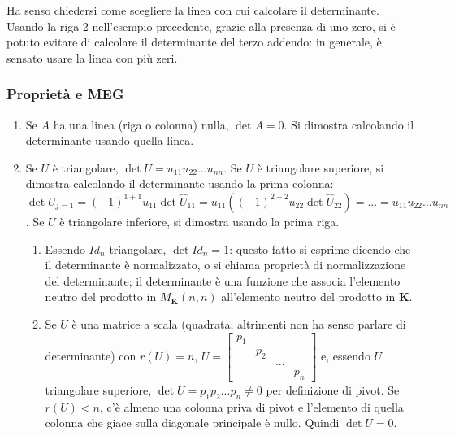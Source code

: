 \documentclass{article}
\begin{document}
Ha senso chiedersi come scegliere la linea con cui calcolare il
determinante. Usando la riga 2 nell'esempio precedente, grazie alla presenza
di uno zero, si \`{e} potuto evitare di calcolare il determinante del terzo
addendo: in generale, \`{e} sensato usare la linea con pi\`{u} zeri.

\subsubsection{Propriet\`{a} e MEG}

\begin{enumerate}
\item Se $A$ ha una linea (riga o colonna) nulla, $\det A=0$. Si dimostra
calcolando il determinante usando quella linea.

\item Se $U$ \`{e} triangolare, $\det U=u_{11}u_{22}...u_{nn}$. Se $U$ \`{e}
triangolare superiore, si dimostra calcolando il determinante usando la
prima colonna: $\det U_{j=1}=\left( -1\right) ^{1+1}u_{11}\det \hat{U}%
_{11}=u_{11}\left( \left( -1\right) ^{2+2}u_{22}\det \hat{U}_{22}\right)
=...=u_{11}u_{22}...u_{nn}$. Se $U$ \`{e} triangolare inferiore, si dimostra
usando la prima riga.

\begin{enumerate}
\item Essendo $Id_{n}$ triangolare, $\det Id_{n}=1$: questo fatto si esprime
dicendo che il determinante \`{e} normalizzato, o si chiama propriet\`{a} di
normalizzazione del determinante; il determinante \`{e} una funzione che
associa l'elemento neutro del prodotto in $M_{\mathbf{K}}\left( n,n\right) $
all'elemento neutro del prodotto in $\mathbf{K}$.

\item Se $U$ \`{e} una matrice a scala (quadrata, altrimenti non ha senso
parlare di determinante) con $r\left( U\right) =n$, $U=\left[ 
\begin{array}{cccc}
p_{1} &  &  &  \\ 
& p_{2} &  &  \\ 
&  & ... &  \\ 
&  &  & p_{n}%
\end{array}%
\right] $ e, essendo $U$ triangolare superiore, $\det
U=p_{1}p_{2}...p_{n}\neq 0$ per definizione di pivot. Se $r\left( U\right)
<n $, c'\`{e} almeno una colonna priva di pivot e l'elemento di quella
colonna che giace sulla diagonale principale \`{e} nullo. Quindi $\det U=0$.
\end{enumerate}


\end{enumerate}
\end{document}
